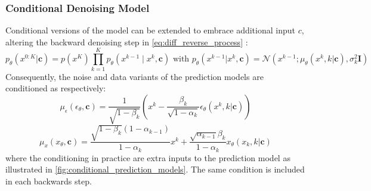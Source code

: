 \subsubsection{Conditional Denoising Model} \label{sec:conditional_diff_model}
Conditional versions of the model can be extended to embrace additional input \( c \), altering the backward denoising step in \autoref{eq:diff_reverse_process} \cite{ho_cascaded_2021}:
\begin{equation} \label{eq:cond_reverse_process}
 p_\theta(x^{0:K} | \mathbf{c}) = p(x^K)\prod_{k=1}^{K} p_\theta(x^{k-1} \mid x^k, \mathbf{c}) \text{ with } p_\theta(x^{k-1}|x^k, \mathbf{c}) = \mathcal{N} (x^{k-1}; \mu_\theta(x^k, k|\mathbf{c}), \sigma^2_k \mathbf{I})   
\end{equation}
Consequently, the noise and data variants of the prediction models are conditioned as respectively:
\begin{equation} \label{eq:cond_ddpm_noise_prediction}
    \mu_\epsilon(\epsilon_\theta, \mathbf{c}) = \frac{1}{\sqrt{1 - \beta_k}}\left(x^k - \frac{\beta_k}{\sqrt{1 - \alpha_k}} \epsilon_\theta(x^k, k | \mathbf{c}) \right)
\end{equation}
\begin{equation} \label{eq:cond_ddpm_data_prediction}
    \mu_x(x_\theta, \mathbf{c}) = \frac{\sqrt{1 - \beta_k}(1 - \alpha_{k-1})}{1 - \alpha_k} x^k + \frac{\sqrt{\alpha_{k-1}}\beta_k}{1 - \alpha_k} x_\theta(x_k, k | \mathbf{c})
\end{equation}
where the conditioning in practice are extra inputs to the prediction model as illustrated in \autoref{fig:conditional_prediction_models}. The same condition is included in each backwards step.

